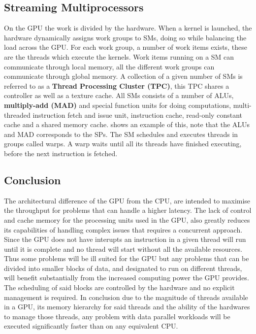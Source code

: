 \subsection{Streaming Multiprocessors}
On the GPU the work is divided by the hardware.
When a kernel is launched, the hardware dynamically assigns work groups to SMs, doing so while balancing the load across the GPU.
For each work group, a number of work items exists, these are the threads which execute the kernels.
Work items running on a SM can communicate through local memory, all the different work groups can communicate through global memory. %
A collection of a given number of SMs is referred to as a \textbf{Thread Processing Cluster (TPC)}, this TPC shares a controller as well as a texture cache.
All SMs consists of a number of ALUs, \textbf{multiply-add (MAD)} and special function units for doing computations, multi-threaded instruction fetch and issue unit, instruction cache, read-only constant cache and a shared memory cache.
 shows an example of this, note that the ALUs and MAD corresponds to the SPs.
The SM schedules and executes threads in groups called warps.
A warp waits until all its threads have finished executing, before the next instruction is fetched. 


\subsection{Conclusion} %
The architectural difference of the GPU from the CPU, are intended to maximise the throughput for problems that can handle a higher latency.
The lack of control and cache memory for the processing units used in the GPU, also greatly reduces its capabilities of handling complex issues that requires a concurrent approach.
Since the GPU does not have interupts an instruction in a given thread will run until it is complete and no thread will start without all the available resources.
Thus some problems will be ill suited for the GPU but any problems that can be divided into smaller blocks of data, and designated to run on different threads, will benefit substantially from the increased computing power the GPU provides.
The scheduling of said blocks are controlled by the hardware and no explicit management is required.
In conclusion due to the magnitude of threads available in a GPU, its memory hierarchy for said threads and the ability of the hardwares to manage those threads, any problem with data parallel workloads will be executed significantly faster than on any equivalent CPU.

